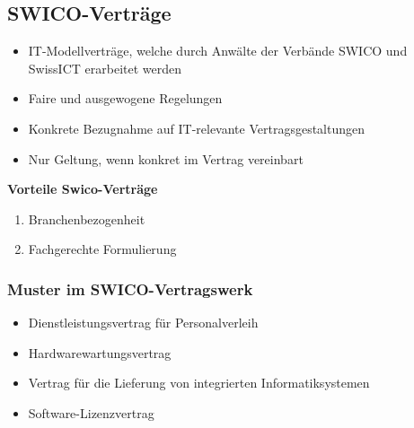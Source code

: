 \subsection{SWICO-Verträge}

\begin{itemize}
	\tightlist
	\item IT-Modellverträge, welche durch Anwälte der Verbände SWICO und
	SwissICT erarbeitet werden
	\item Faire und ausgewogene Regelungen
	\item Konkrete Bezugnahme auf IT-relevante Vertragsgestaltungen
	\item Nur Geltung, wenn konkret im Vertrag vereinbart
\end{itemize}

\textbf{Vorteile Swico-Verträge}

\begin{enumerate}
	\tightlist
	\item Branchenbezogenheit
	\item Fachgerechte Formulierung
\end{enumerate}

\subsubsection{Muster im SWICO-Vertragswerk}

\begin{itemize}
	\item Dienstleistungsvertrag für Personalverleih
	\item Hardwarewartungsvertrag
	\item Vertrag für die Lieferung von integrierten Informatiksystemen
	\item Software-Lizenzvertrag
\end{itemize}
